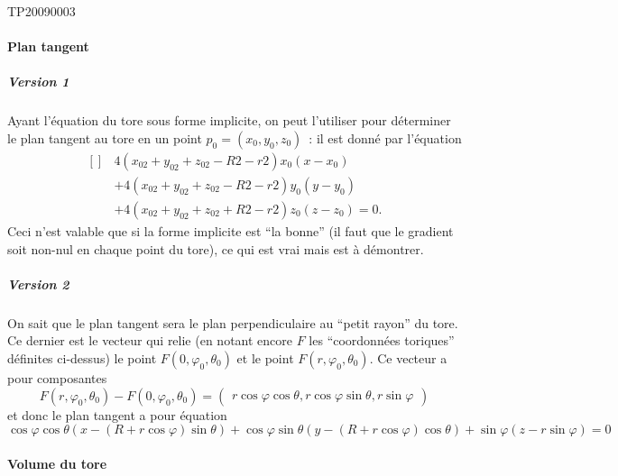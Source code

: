 \begin{corrige}{TP20090003}
\paragraph{Plan tangent}
\subparagraph{Version 1}
Ayant l'équation du tore sous forme implicite, on peut l'utiliser pour
déterminer le plan tangent au tore en un point $p_0 = (x_0,y_0,z_0)$~:
il est donné par l'équation
\begin{equation}
	\begin{aligned}[]
  &4 (x_02 + y_02 + z_02 - R2 - r2) x_0 (x - x_0)\\ 
  &+ 4 (x_02 +y_02 + z_02 - R2 - r2) y_0 (y - y_0)\\
  &+ 4 (x_02 + y_02 + z_02 + R2 - r2) z_0 (z - z_0) = 0.
	\end{aligned}
\end{equation}
Ceci n'est valable que si la forme implicite est ``la bonne'' (il faut
que le gradient soit non-nul en chaque point du tore), ce qui est vrai
mais est à démontrer.

\subparagraph{Version 2}
On sait que le plan tangent sera le plan perpendiculaire au ``petit
rayon'' du tore. Ce dernier est le vecteur qui relie (en notant encore
$F$ les ``coordonnées toriques'' définites ci-dessus) le point
$F(0,\varphi_0,\theta_0)$ et le point $F(r,\varphi_0,\theta_0)$. Ce
vecteur a pour composantes
\begin{equation*}
  F(r,\varphi_0,\theta_0) - F(0,\varphi_0,\theta_0) = 
  \begin{pmatrix}
    r \cos \varphi \cos \theta,r \cos \varphi \sin \theta,r \sin
    \varphi
  \end{pmatrix}
\end{equation*}
et donc le plan tangent a pour équation
\begin{equation*}
  \cos \varphi \cos \theta (x - (R + r \cos \varphi)\sin\theta) + \cos
  \varphi \sin \theta (y - (R + r \cos \varphi)\cos\theta) + \sin
  \varphi (z - r \sin \varphi) = 0
\end{equation*}

\paragraph{Volume du tore}


\end{corrige}

